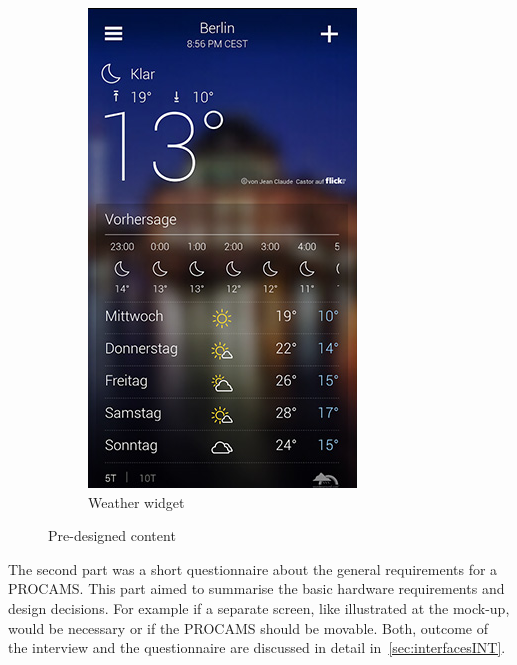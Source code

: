 \begin{figure}[htbp]
\begin{subfigure}[b]{0.3\textwidth}
                \includegraphics[width=\textwidth]{images/interview/samples/weather.png}
                \caption{Weather widget}
                \label{fig:mouse}
        \end{subfigure}
        \caption{Pre-designed content}\label{img:mockupContent}
\end{figure}

The second part was a short questionnaire about the general requirements for a \ac{PROCAMS}. This part aimed to summarise the basic hardware requirements and design decisions. For example if a separate screen, like illustrated at the mock-up, would be necessary or if the \ac{PROCAMS} should be movable. Both, outcome of the interview and the questionnaire are discussed in detail in~\autoref{sec:interfacesINT}.

